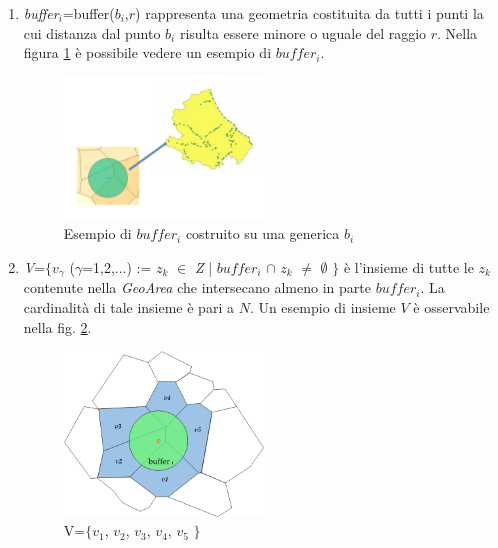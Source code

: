 \begin{enumerate}
\item\textit{buffer$_i$}=buffer($b_i$,$r$) rappresenta una geometria costituita da tutti i punti la cui distanza dal punto $b_i$ risulta essere minore o uguale del raggio $r$. Nella figura \ref{fig:bufferi} è possibile vedere un esempio di $buffer_i$.
\begin{figure}[bht]
\centering
\includegraphics[width=0.5\textwidth]{img/buffer}
\caption{Esempio di $buffer_i$ costruito su una generica $b_i$}
\label{fig:bufferi}
\end{figure}
\newpage
\item\textit{V}=$\{$$v_\gamma$ ($\gamma$=1,2,...) := $z_k$ $\in$ \textit{Z} | $buffer_i$ $\cap$ $z_k$ $\neq$ $\emptyset$ $\}$ è l'insieme di tutte le $z_k$ contenute nella \textit{GeoArea} che intersecano almeno in parte \textit{$buffer_i$}. La cardinalità di tale insieme è pari a $N$. Un esempio di insieme $V$ è osservabile nella fig. \ref{fig:v}.
\begin{figure}[bht]
\centering
\includegraphics[width=0.5\textwidth]{img/V}
\caption{V=$\{$$v_1$, $v_2$, $v_3$, $v_4$, $v_5$ $\}$}
\label{fig:v}
\end{figure}


\end{enumerate}
